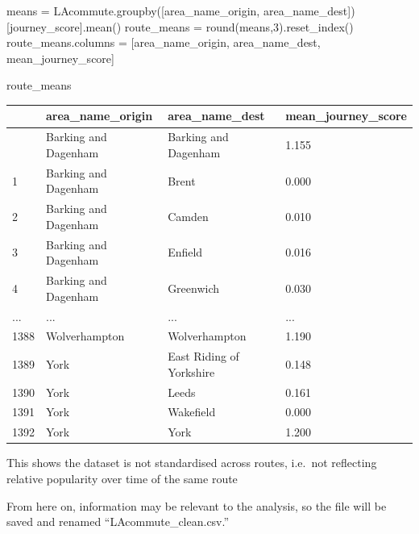 \documentclass[
  number]{elsarticle}
\newenvironment{Shaded}{\begin{snugshade}}{\end{snugshade}}
\newcommand{\BuiltInTok}[1]{\textcolor[rgb]{0.00,0.23,0.31}{#1}}
\newcommand{\DecValTok}[1]{\textcolor[rgb]{0.68,0.00,0.00}{#1}}
\newcommand{\NormalTok}[1]{\textcolor[rgb]{0.00,0.23,0.31}{#1}}
\newcommand{\OperatorTok}[1]{\textcolor[rgb]{0.37,0.37,0.37}{#1}}
\newcommand{\StringTok}[1]{\textcolor[rgb]{0.13,0.47,0.30}{#1}}
\begin{document}
\begin{Shaded}
\begin{Highlighting}[]
\NormalTok{means }\OperatorTok{=}\NormalTok{ LAcommute.groupby([}\StringTok{\textquotesingle{}area\_name\_origin\textquotesingle{}}\NormalTok{, }\StringTok{\textquotesingle{}area\_name\_dest\textquotesingle{}}\NormalTok{])[}\StringTok{\textquotesingle{}journey\_score\textquotesingle{}}\NormalTok{].mean()}
\NormalTok{route\_means }\OperatorTok{=} \BuiltInTok{round}\NormalTok{(means,}\DecValTok{3}\NormalTok{).reset\_index()}
\NormalTok{route\_means.columns }\OperatorTok{=}\NormalTok{ [}\StringTok{\textquotesingle{}area\_name\_origin\textquotesingle{}}\NormalTok{, }\StringTok{\textquotesingle{}area\_name\_dest\textquotesingle{}}\NormalTok{, }\StringTok{\textquotesingle{}mean\_journey\_score\textquotesingle{}}\NormalTok{]}

\NormalTok{route\_means}
\end{Highlighting}
\end{Shaded}

\begin{longtable}[]{@{}llll@{}}
\toprule\noalign{}
& area\_name\_origin & area\_name\_dest & mean\_journey\_score \\
\midrule\noalign{}
\endhead
\bottomrule\noalign{}
\endlastfoot
0 & Barking and Dagenham & Barking and Dagenham & 1.155 \\
1 & Barking and Dagenham & Brent & 0.000 \\
2 & Barking and Dagenham & Camden & 0.010 \\
3 & Barking and Dagenham & Enfield & 0.016 \\
4 & Barking and Dagenham & Greenwich & 0.030 \\
... & ... & ... & ... \\
1388 & Wolverhampton & Wolverhampton & 1.190 \\
1389 & York & East Riding of Yorkshire & 0.148 \\
1390 & York & Leeds & 0.161 \\
1391 & York & Wakefield & 0.000 \\
1392 & York & York & 1.200 \\
\end{longtable}

This shows the dataset is not standardised across routes, i.e.~not
reflecting relative popularity over time of the same route

From here on, information may be relevant to the analysis, so the file
will be saved and renamed ``LAcommute\_clean.csv.''
\end{document}
